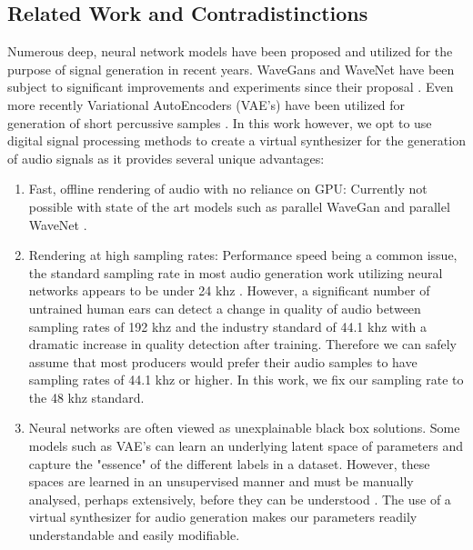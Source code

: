 \documentclass{nime-alternate} %
\begin{document}
\subsection{Related Work and Contradistinctions}
\label{related}
Numerous deep, neural network models have been proposed and utilized for the purpose of signal generation in recent years. WaveGans and WaveNet have been subject to significant improvements and experiments since their proposal \cite{nsynth2017,yamamoto2019parallel,oord2017parallel}. Even more recently Variational AutoEncoders (VAE's) have been utilized for generation of short percussive samples \cite{aouameur2019neural,ramires2019timbfeat}. In this work however, we opt to use digital signal processing methods to create a virtual synthesizer for the generation of audio signals as it provides several unique advantages:
\begin{enumerate}[label=\roman*]
  \item Fast, offline rendering of audio with no reliance on GPU: Currently not possible with state of the art models such as parallel WaveGan \cite{yamamoto2019parallel} and parallel WaveNet \cite{oord2017parallel}. 
  \item Rendering at high sampling rates: Performance speed being a common issue, the standard sampling rate in most audio generation work utilizing neural networks appears to be under 24 khz \cite{yamamoto2019parallel,oord2017parallel,aouameur2019neural,ramires2019timbfeat}. However, a significant number of untrained human ears can detect a change in quality of audio between sampling rates of 192 khz and the industry standard of 44.1 khz \cite{reiss2016meta} with a dramatic increase in quality detection after training. Therefore we can safely assume that most producers would prefer their audio samples to have sampling rates of 44.1 khz or higher. In this work, we fix our sampling rate to the 48 khz standard. 
  \item Neural networks are often viewed as unexplainable black box solutions. Some models such as VAE's can learn an underlying latent space of parameters and capture the "essence" of the different labels in a dataset. However, these spaces are learned in an unsupervised manner and must be manually analysed, perhaps extensively, before they can be understood \cite{esling2018generative}. The use of a virtual synthesizer for audio generation makes our parameters readily understandable and easily modifiable. \\
  
\end{enumerate}
\end{document}
